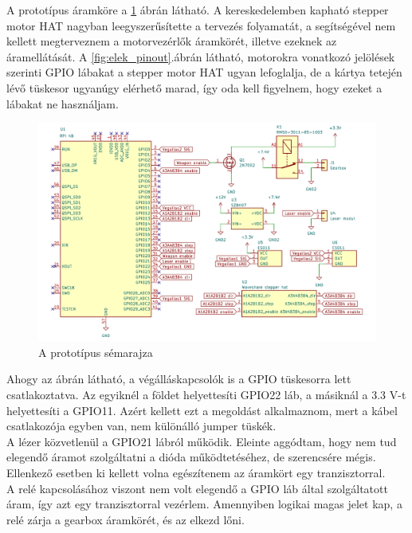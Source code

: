 \documentclass[12pt,a4paper]{article}
\begin{document}
A prototípus áramköre a \ref{fig:schematic} ábrán látható. A kereskedelemben kapható stepper motor HAT nagyban leegyszerűsítette a tervezés folyamatát, a segítségével nem kellett megterveznem a motorvezérlők áramkörét, illetve ezeknek az áramellátását. A \ref{fig:elek_pinout}.ábrán látható, motorokra vonatkozó jelölések szerinti GPIO lábakat a stepper motor HAT ugyan lefoglalja, de a kártya tetején lévő tüskesor ugyanúgy elérhető marad, így oda kell figyelnem, hogy ezeket a lábakat ne használjam. \\

\begin{figure}[h!]
	\centering
	\includegraphics[width=1\linewidth]{schematic2}
	\caption{A prototípus sémarajza}
	\label{fig:schematic}
\end{figure}

Ahogy az ábrán látható, a végálláskapcsolók is a GPIO tüskesorra lett csatlakoztatva. Az egyiknél a földet helyettesíti GPIO22 láb, a másiknál a 3.3 V-t helyettesíti a GPIO11. Azért kellett ezt a megoldást alkalmaznom, mert a kábel csatlakozója egyben van, nem különálló jumper tüskék.\\

A lézer közvetlenül a GPIO21 lábról működik. Eleinte aggódtam, hogy nem tud elegendő áramot szolgáltatni a dióda működtetéséhez, de szerencsére mégis. Ellenkező esetben ki kellett volna egészítenem az áramkört egy tranzisztorral. \\

A relé kapcsolásához viszont nem volt elegendő a GPIO láb által szolgáltatott áram, így azt egy tranzisztorral vezérlem. Amennyiben logikai magas jelet kap, a relé zárja a gearbox áramkörét, és az elkezd lőni.
\end{document}

